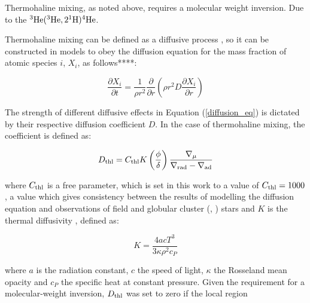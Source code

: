 \documentclass[12pt, a4paper]{report}
\begin{document}
Thermohaline mixing, as noted above, requires a molecular weight inversion. Due to the $^{3}\textnormal{He}(^{3}\textnormal{He},2^{1}\textnormal{H})^{4}\textnormal{He}$.

Thermohaline mixing can be defined as a diffusive process \citep{1980A&A....91..175K}, so it can be constructed in models to obey the diffusion equation for the mass fraction of atomic species $i$, $X_{i}$, as follows****:

\begin{equation}
\frac{\partial X_{i}}{\partial t} = \frac{1}{\rho r^{2}}\frac{\partial}{\partial r} \left( \rho r^{2} D \frac{\partial X_{i}}{\partial r} \right)
\label{diffusion_eq}
\end{equation}

The strength of different diffusive effects in Equation (\ref{diffusion_eq}) is dictated by their respective diffusion coefficient $D$. In the case of thermohaline mixing, the coefficient is defined \cite{2010A&A...521A...9C} as:

\begin{equation}
D_{\textnormal{thl}} = C_{\textnormal{thl}} K \left( \frac{\phi}{\delta} \right) \frac{\nabla _{\mu}}{\nabla _{\textnormal{rad}} - \nabla _{\textnormal{ad}}}
\label{Dthl_def}
\end{equation}

where $C_{\textnormal{thl}}$ is a free parameter, which is set in this work to a value of $C_{\textnormal{thl}} = 1000$, a value which gives consistency between the results of modelling the diffusion equation and observations of field \citep{2007A&A...467L..15C} and globular cluster (\cite{2011ApJ...728...79A}, \cite{2012ApJ...749..128A}) stars and $K$ is the thermal diffusivity \citep{2017RSOS....470192S}, defined as:

\begin{equation}
K = \frac{4acT^{3}}{3\kappa\rho ^{2}c_{P}}
\label{diffusivity_def}
\end{equation}

where $a$ is the radiation constant, $c$ the speed of light, $\kappa$ the Rosseland mean opacity and $c_{P}$ the specific heat at constant pressure.
Given the requirement for a molecular-weight inversion, $D_{\textnormal{thl}}$ was set to zero if the local region 



%
\end{document}
